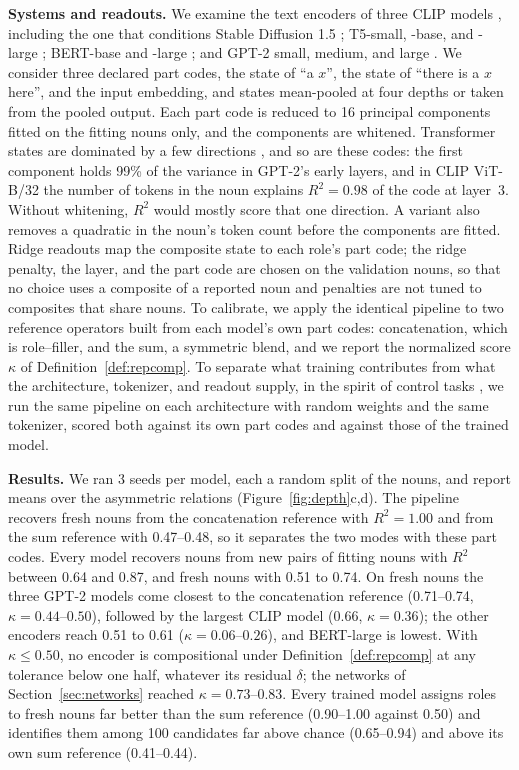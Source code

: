 \documentclass[10pt]{article}
\theoremstyle{plain}
\theoremstyle{remark}
\begin{document}
\textbf{Systems and readouts.} We examine the text encoders of three CLIP models \citep{radford2021clip}, including the one that conditions Stable Diffusion 1.5 \citep{rombach2022}; T5-small, -base, and -large \citep{raffel2020t5}; BERT-base and -large \citep{devlin2019bert}; and GPT-2 small, medium, and large \citep{radford2019gpt2}. We consider three declared part codes, the state of ``a $x$'', the state of ``there is a $x$ here'', and the input embedding, and states mean-pooled at four depths or taken from the pooled output. Each part code is reduced to 16 principal components fitted on the fitting nouns only, and the components are whitened. Transformer states are dominated by a few directions \citep{ethayarajh2019,timkey2021}, and so are these codes: the first component holds 99\% of the variance in GPT-2's early layers, and in CLIP ViT-B/32 the number of tokens in the noun explains $R^2 = 0.98$ of the code at layer~3. Without whitening, $R^2$ would mostly score that one direction. A variant also removes a quadratic in the noun's token count before the components are fitted. Ridge readouts map the composite state to each role's part code; the ridge penalty, the layer, and the part code are chosen on the validation nouns, so that no choice uses a composite of a reported noun and penalties are not tuned to composites that share nouns. To calibrate, we apply the identical pipeline to two reference operators built from each model's own part codes: concatenation, which is role--filler, and the sum, a symmetric blend, and we report the normalized score $\kappa$ of Definition~\ref{def:repcomp}. To separate what training contributes from what the architecture, tokenizer, and readout supply, in the spirit of control tasks \citep{hewitt2019}, we run the same pipeline on each architecture with random weights and the same tokenizer, scored both against its own part codes and against those of the trained model.

\textbf{Results.} We ran 3 seeds per model, each a random split of the nouns, and report means over the asymmetric relations (Figure~\ref{fig:depth}c,d). The pipeline recovers fresh nouns from the concatenation reference with $R^2 = 1.00$ and from the sum reference with 0.47--0.48, so it separates the two modes with these part codes. Every model recovers nouns from new pairs of fitting nouns with $R^2$ between 0.64 and 0.87, and fresh nouns with 0.51 to 0.74. On fresh nouns the three GPT-2 models come closest to the concatenation reference (0.71--0.74, $\kappa = 0.44$--$0.50$), followed by the largest CLIP model (0.66, $\kappa = 0.36$); the other encoders reach 0.51 to 0.61 ($\kappa = 0.06$--$0.26$), and BERT-large is lowest. With $\kappa \le 0.50$, no encoder is compositional under Definition~\ref{def:repcomp} at any tolerance below one half, whatever its residual $\delta$; the networks of Section~\ref{sec:networks} reached $\kappa = 0.73$--$0.83$. Every trained model assigns roles to fresh nouns far better than the sum reference (0.90--1.00 against 0.50) and identifies them among 100 candidates far above chance (0.65--0.94) and above its own sum reference (0.41--0.44).
\end{document}
